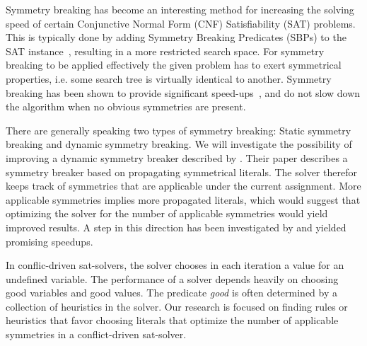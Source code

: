 Symmetry breaking has become an interesting method for increasing the solving speed of
certain Conjunctive Normal Form (CNF) Satisfiability (SAT) problems.
This is typically done by adding Symmetry Breaking Predicates (SBPs) to the SAT
instance~\cite{sakallah2009symmetry}, resulting in a more restricted search space.
For symmetry breaking to be applied effectively the given problem has to exert symmetrical
properties, i.e. some search tree is virtually identical to another.
Symmetry breaking has been shown to provide significant
speed-ups~\cite{darga2004exploiting,aloul2003solving}, and do not slow down the algorithm
when no obvious symmetries are present.

There are generally speaking two types of symmetry breaking: Static symmetry breaking and
dynamic symmetry breaking.
We will investigate the possibility of improving a dynamic symmetry breaker described by
\cite{devriendt2012symmetry}.
Their paper describes a symmetry breaker based on propagating symmetrical literals.
The solver therefor keeps track of symmetries that are applicable under the current assignment.
More applicable symmetries implies more propagated literals, which would suggest that
optimizing the solver for the number of applicable symmetries would yield improved results.
A step in this direction has been investigated by \cite{devriendt2012symmetry} and yielded
promising speedups.

In conflic-driven sat-solvers, the solver chooses in each iteration a value for an undefined
variable.
The performance of a solver depends heavily on choosing good variables and good values.
The predicate \emph{good} is often determined by a collection of heuristics in the solver.
Our research is focused on finding rules or heuristics that favor choosing literals
that optimize the number of applicable symmetries in a conflict-driven sat-solver.

